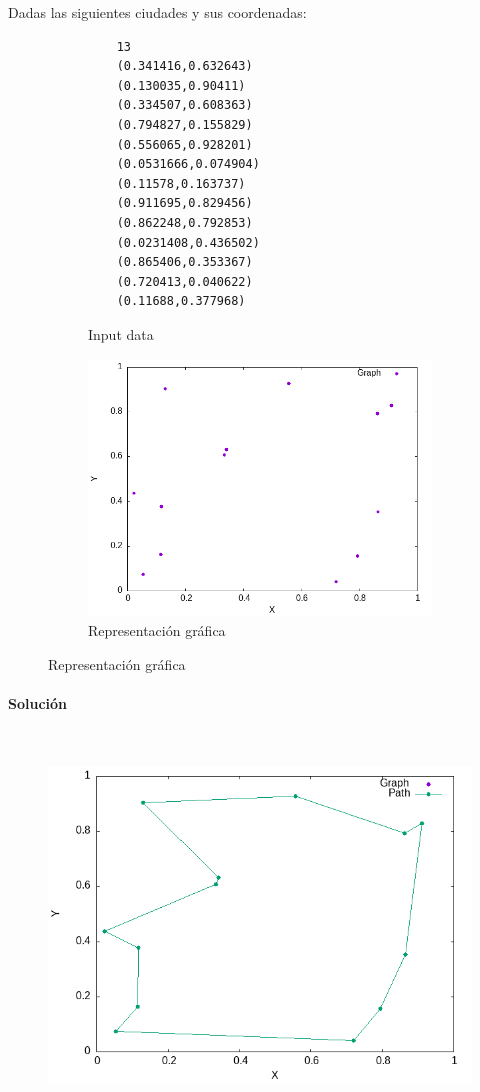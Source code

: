 \documentclass{article}
\newcommand{\myparagraph}[1]{\paragraph{#1}\mbox{}\\}
\begin{document}
\begin{ejemplo}
Dadas las siguientes ciudades y sus coordenadas:
\begin{figure}[!hbt]
\centering
    \begin{subfigure}{0.3\textwidth}
    \begin{verbatim}
    13
    (0.341416,0.632643)
    (0.130035,0.90411)
    (0.334507,0.608363)
    (0.794827,0.155829)
    (0.556065,0.928201)
    (0.0531666,0.074904)
    (0.11578,0.163737)
    (0.911695,0.829456)
    (0.862248,0.792853)
    (0.0231408,0.436502)
    (0.865406,0.353367)
    (0.720413,0.040622)
    (0.11688,0.377968)
    \end{verbatim}
    \caption{Input data}
    \end{subfigure}
    \hfill
    \begin{subfigure}{0.45\textwidth}
        \centering
        \includegraphics[width=\textwidth]{Problema4/imagenes/example_graph2.png}
        \caption{Representación gráfica}
        \label{fig:example_graph}
    \end{subfigure}
\end{figure}
\end{ejemplo}
\myparagraph{Solución}
\begin{figure}[H]
    \centering
    \includegraphics[scale = 0.40]{Problema4/imagenes/example_path2.png}
\end{figure} 
\end{document}
